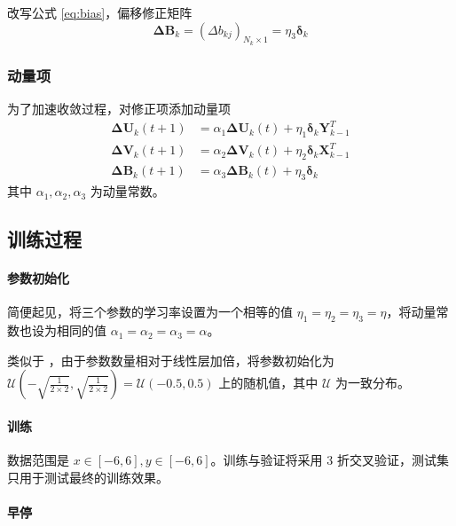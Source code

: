     改写公式 \eqref{eq:bias}，偏移修正矩阵
    \begin{equation*}
        \mathbf{\Delta B}_{k} = (\Delta b_{kj})_{N_{k}\times 1} = \eta_3 \boldsymbol{\delta}_{k}
    \end{equation*}

    \subsubsection{动量项}

    为了加速收敛过程，对修正项添加动量项
    \begin{align}
        \mathbf{\Delta U}_{k}(t+1) &= \alpha_1\mathbf{\Delta U}_{k}(t) + \eta_1 \boldsymbol{\delta}_k\mathbf{Y}_{k-1}^T \\
        \mathbf{\Delta V}_{k}(t+1) &= \alpha_2\mathbf{\Delta V}_{k}(t) + \eta_2 \boldsymbol{\delta}_k\mathbf{X}_{k-1}^T \\
        \mathbf{\Delta B}_{k}(t+1) &= \alpha_3\mathbf{\Delta B}_{k}(t) + \eta_3 \boldsymbol{\delta}_{k}
    \end{align}
    其中 $\alpha_1,\alpha_2,\alpha_3$ 为动量常数。

    \subsection{训练过程}

    \paragraph{参数初始化}

    简便起见，将三个参数的学习率设置为一个相等的值 $\eta_1=\eta_2=\eta_3=\eta$，将动量常数也设为相同的值 $\alpha_1=\alpha_2=\alpha_3=\alpha$。

    类似于 \cite{torchlinear}，由于参数数量相对于线性层加倍，将参数初始化为 $\mathcal{U}\left(-\sqrt{\frac{1}{2\times 2}},\sqrt{\frac{1}{2\times 2}}\right)=\mathcal{U}(-0.5,0.5)$ 上的随机值，其中 $\mathcal{U}$ 为一致分布。

    \paragraph{训练}

    数据范围是 $x\in[-6,6],y\in[-6,6]$。训练与验证将采用 3 折交叉验证，测试集只用于测试最终的训练效果。

    \paragraph{早停}

